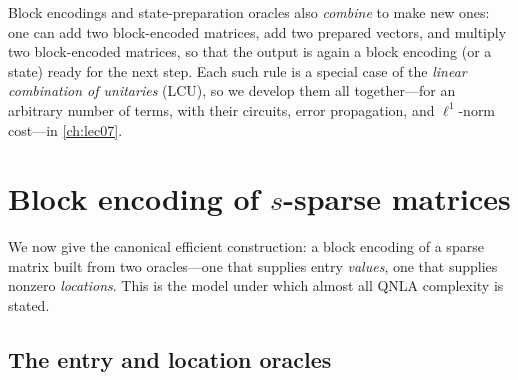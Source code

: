 Block encodings and state-preparation oracles also \emph{combine} to make new ones:
one can add two block-encoded matrices, add two prepared vectors, and multiply two
block-encoded matrices, so that the output is again a block encoding (or a state)
ready for the next step. Each such rule is a special case of the \emph{linear
combination of unitaries} (LCU), so we develop them all together---for an arbitrary
number of terms, with their circuits, error propagation, and $\ell^1$-norm
cost---in \cref{ch:lec07}.

\section{Block encoding of \texorpdfstring{$s$}{s}-sparse matrices}
\label{sec:lec06-3}

We now give the canonical efficient construction: a block encoding of a sparse
matrix built from two oracles---one that supplies entry \emph{values}, one that
supplies nonzero \emph{locations}. This is the model under which almost all QNLA
complexity is stated.

\subsection*{The entry and location oracles}

